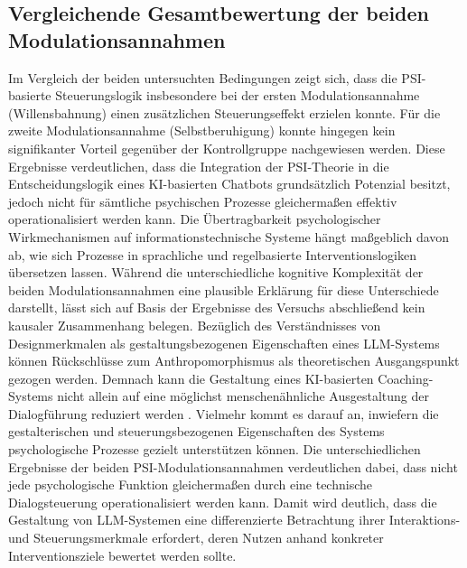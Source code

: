 \subsection{Vergleichende Gesamtbewertung der beiden Modulationsannahmen}
Im Vergleich der beiden untersuchten Bedingungen zeigt sich, dass die PSI-basierte Steuerungslogik insbesondere bei der ersten Modulationsannahme (Willensbahnung) einen zusätzlichen Steuerungseffekt erzielen konnte. Für die zweite Modulationsannahme (Selbstberuhigung) konnte hingegen kein signifikanter Vorteil gegenüber der Kontrollgruppe nachgewiesen werden. Diese Ergebnisse verdeutlichen, dass die Integration der PSI-Theorie in die Entscheidungslogik eines KI-basierten Chatbots grundsätzlich Potenzial besitzt, jedoch nicht für sämtliche psychischen Prozesse gleichermaßen effektiv operationalisiert werden kann. Die Übertragbarkeit psychologischer Wirkmechanismen auf informationstechnische Systeme hängt maßgeblich davon ab, wie sich Prozesse in sprachliche und regelbasierte Interventionslogiken übersetzen lassen. Während die unterschiedliche kognitive Komplexität der beiden Modulationsannahmen eine plausible Erklärung für diese Unterschiede darstellt, lässt sich auf Basis der Ergebnisse des Versuchs abschließend kein kausaler Zusammenhang belegen.
Bezüglich des Verständnisses von Designmerkmalen als gestaltungsbezogenen Eigenschaften eines LLM-Systems können Rückschlüsse zum Anthropomorphismus als theoretischen Ausgangspunkt gezogen werden. Demnach kann die Gestaltung eines KI-basierten Coaching-Systems nicht allein auf eine möglichst menschenähnliche Ausgestaltung der Dialogführung reduziert werden \citep{Xiao2025Humanizing}. Vielmehr kommt es darauf an, inwiefern die gestalterischen und steuerungsbezogenen Eigenschaften des Systems psychologische Prozesse gezielt unterstützen können. Die unterschiedlichen Ergebnisse der beiden PSI-Modulationsannahmen verdeutlichen dabei, dass nicht jede psychologische Funktion gleichermaßen durch eine technische Dialogsteuerung operationalisiert werden kann. Damit wird deutlich, dass die Gestaltung von LLM-Systemen eine differenzierte Betrachtung ihrer Interaktions- und Steuerungsmerkmale erfordert, deren Nutzen anhand konkreter Interventionsziele bewertet werden sollte.

